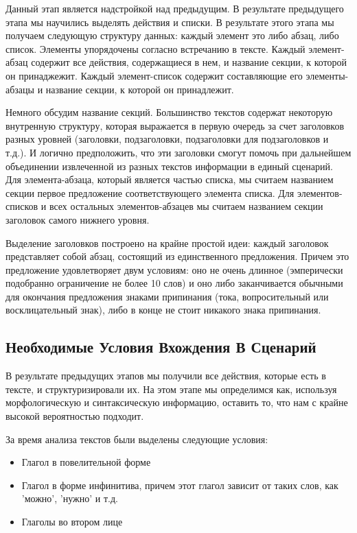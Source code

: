 \documentclass[12pt]{article}
\begin{document}
Данный этап является надстройкой над предыдущим. В результате предыдущего этапа мы научились выделять действия и списки. В результате этого этапа мы получаем следующую структуру данных: каждый элемент это либо абзац, либо список. Элементы упорядочены согласно встречанию в тексте. Каждый элемент-абзац содержит все действия, содержащиеся в нем, и название секции, к которой он принаджежит. Каждый элемент-список содержит составляющие его элементы-абзацы и название секции, к которой он принадлежит.

Немного обсудим название секций. Большинство текстов содержат некоторую внутренную структуру, которая выражается в первую очередь за счет заголовков разных уровней (заголовки, подзаголовки, подзаголовки для подзаголовков и т.д.). И логично предположить, что эти заголовки смогут помочь при дальнейшем объединении извлеченной из разных текстов информации в единый сценарий. Для элемента-абзаца, который является частью списка, мы считаем названием секции первое предложение соответствующего элемента списка. Для элементов-списков и всех остальных элементов-абзацев мы считаем названием секции заголовок самого нижнего уровня.

Выделение заголовков построено на крайне простой идеи: каждый заголовок представляет собой абзац, состоящий из единственного предложения. Причем это предложение удовлетворяет двум условиям: оно не очень длинное (эмперически подобранно ограничение не более 10 слов) и оно либо заканчивается обычными для окончания предложения знаками припинания (тока, вопросительный или восклицательный знак), либо в конце не стоит никакого знака припинания.

\subsection{Необходимые Условия Вхождения В Сценарий}
\label{marker4}

В результате предыдущих этапов мы получили все действия, которые есть в тексте, и структуризировали их. На этом этапе мы определимся как, используя морфологическую и синтаксическую информацию, оставить то, что нам с крайне высокой вероятностью подходит.

За время анализа текстов были выделены следующие условия:

\begin{itemize}
	\item Глагол в повелительной форме
	\item Глагол в форме инфинитива, причем этот глагол зависит от таких слов, как 'можно', 'нужно' и т.д.
	\item Глаголы во втором лице
\end{itemize}
\end{document}
